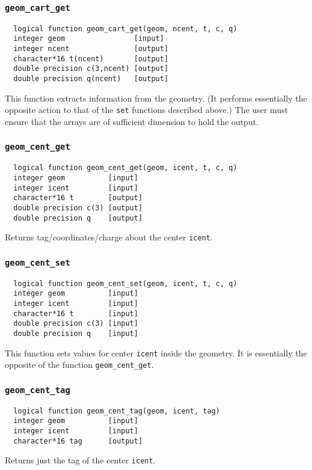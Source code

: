 \subsubsection{{\tt geom\_cart\_get}}
\begin{verbatim}
  logical function geom_cart_get(geom, ncent, t, c, q)
  integer geom                [input]
  integer ncent               [output]
  character*16 t(ncent)       [output]
  double precision c(3,ncent) [output]
  double precision q(ncent)   [output]
\end{verbatim}
This function extracts information from the geometry.  (It performs
essentially the opposite action to that of the \verb+set+ functions
described above.)  The user must ensure 
that the arrays are of sufficient
dimension to hold the output.

\subsubsection{{\tt geom\_cent\_get}}
\begin{verbatim}  
  logical function geom_cent_get(geom, icent, t, c, q)
  integer geom          [input]
  integer icent         [input]
  character*16 t        [output]
  double precision c(3) [output]
  double precision q    [output]
\end{verbatim}
Returns tag/coordinates/charge about the center {\tt icent}.

\subsubsection{{\tt geom\_cent\_set}}
\begin{verbatim}
  logical function geom_cent_set(geom, icent, t, c, q)
  integer geom          [input]
  integer icent         [input]
  character*16 t        [input]
  double precision c(3) [input]
  double precision q    [input]
\end{verbatim}
This function sets values for center {\tt icent} inside the geometry.  It
is
essentially the opposite of the function
\verb+geom_cent_get+.

\subsubsection{{\tt geom\_cent\_tag}}
\begin{verbatim}
  logical function geom_cent_tag(geom, icent, tag)
  integer geom          [input]
  integer icent         [input]
  character*16 tag      [output]
\end{verbatim}
Returns just the tag of the center {\tt icent}.


